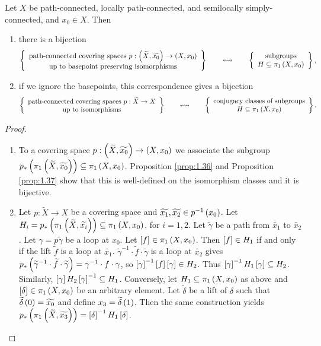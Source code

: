 \begin{theorem}
Let $ X $ be path-connected, locally path-connected, and semilocally simply-connected, and $ x_0 \in X $. Then
\begin{enumerate}
\item there is a bijection
$$ \correspondence{\text{path-connected covering spaces} \ p : \rb{\widetilde{X}, \widetilde{x_0}} \to \rb{X, x_0} \\ \text{up to basepoint preserving isomorphisms}}{\text{subgroups} \\ H \subseteq \pi_1\rb{X, x_0}}, $$
\item if we ignore the basepoints, this correspondence gives a bijection
$$ \correspondence{\text{path-connected covering spaces} \ p : \widetilde{X} \to X \\ \text{up to isomorphisms}}{\text{conjugacy classes of subgroups} \\ H \subseteq \pi_1\rb{X, x_0}}. $$
\end{enumerate}
\end{theorem}

\begin{proof}
\hfill
\begin{enumerate}
\item To a covering space $ p : \rb{\widetilde{X}, \widetilde{x_0}} \to \rb{X, x_0} $ we associate the subgroup $ p_*\rb{\pi_1\rb{\widetilde{X}, \widetilde{x_0}}} \subseteq \pi_1\rb{X, x_0} $. Proposition \ref{prop:1.36} and Proposition \ref{prop:1.37} show that this is well-defined on the isomorphism classes and it is bijective.
\item Let $ p : \widetilde{X} \to X $ be a covering space and $ \widetilde{x_1}, \widetilde{x_2} \in p^{-1}\rb{x_0} $. Let $ H_i = p_*\rb{\pi_1\rb{\widetilde{X}, \widetilde{x_i}}} \subseteq \pi_1\rb{X, x_0} $, for $ i = 1, 2 $. Let $ \widetilde{\gamma} $ be a path from $ \widetilde{x_1} $ to $ \widetilde{x_2} $. Let $ \gamma = p\widetilde{\gamma} $ be a loop at $ x_0 $. Let $ \sb{f} \in \pi_1\rb{X, x_0} $. Then $ \sb{f} \in H_1 $ if and only if the lift $ \widetilde{f} $ is a loop at $ \widetilde{x_1} $. $ \widetilde{\gamma}^{-1} \cdot \widetilde{f} \cdot \widetilde{\gamma} $ is a loop at $ \widetilde{x_2} $ gives $ p_*\rb{\widetilde{\gamma}^{-1} \cdot \widetilde{f} \cdot \widetilde{\gamma}} = \gamma^{-1} \cdot f \cdot \gamma $, so $ \sb{\gamma}^{-1}\sb{f}\sb{\gamma} \in H_2 $. Thus $ \sb{\gamma}^{-1}H_1\sb{\gamma} \subseteq H_2 $. Similarly, $ \sb{\gamma}H_2\sb{\gamma}^{-1} \subseteq H_1 $. Conversely, let $ H_1 \subseteq \pi_1\rb{X, x_0} $ as above and $ \sb{\delta} \in \pi_1\rb{X, x_0} $ be an arbitrary element. Let $ \widetilde{\delta} $ be a lift of $ \delta $ such that $ \widetilde{\delta}\rb{0} = \widetilde{x_0} $ and define $ x_3 = \widetilde{\delta}\rb{1} $. Then the same construction yields $ p_*\rb{\pi_1\rb{\widetilde{X}, \widetilde{x_3}}} = \sb{\delta}^{-1}H_1\sb{\delta} $.
\end{enumerate}
\end{proof}

